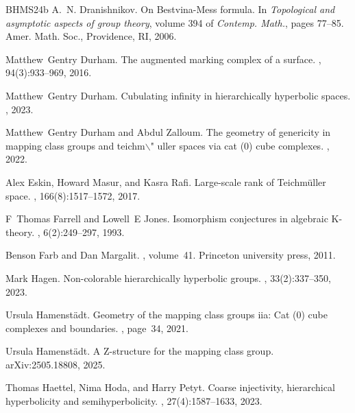 \documentclass{amsart}
\theoremstyle{definition}
\theoremstyle{remark}
\theoremstyle{definition}
\begin{document}
\begin{thebibliography}{BHMS24b}
A.~N. Dranishnikov.
\newblock On {B}estvina-{M}ess formula.
\newblock In {\em Topological and asymptotic aspects of group theory}, volume
  394 of {\em Contemp. Math.}, pages 77--85. Amer. Math. Soc., Providence, RI,
  2006.

Matthew~Gentry Durham.
\newblock The augmented marking complex of a surface.
, 94(3):933--969, 2016.

Matthew~Gentry Durham.
\newblock Cubulating infinity in hierarchically hyperbolic spaces.
, 2023.

Matthew~Gentry Durham and Abdul Zalloum.
\newblock The geometry of genericity in mapping class groups and
  teichm$\backslash$" uller spaces via cat (0) cube complexes.
,
  2022.

Alex Eskin, Howard Masur, and Kasra Rafi.
\newblock Large-scale rank of {T}eichm\"{u}ller space.
, 166(8):1517--1572, 2017.

F~Thomas Farrell and Lowell~E Jones.
\newblock Isomorphism conjectures in algebraic {K}-theory.
, 6(2):249--297,
  1993.

Benson Farb and Dan Margalit.
, volume~41.
\newblock Princeton university press, 2011.

Mark Hagen.
\newblock Non-colorable hierarchically hyperbolic groups.
, 33(2):337--350, 2023.

Ursula Hamenst{\"a}dt.
\newblock Geometry of the mapping class groups iia: Cat (0) cube complexes and
  boundaries.
, page~34, 2021.

Ursula Hamenst\"adt.
\newblock A {Z}-structure for the mapping class group.
\newblock arXiv:2505.18808, 2025.

Thomas Haettel, Nima Hoda, and Harry Petyt.
\newblock Coarse injectivity, hierarchical hyperbolicity and semihyperbolicity.
, 27(4):1587--1633, 2023.


\end{thebibliography}
\end{document}
